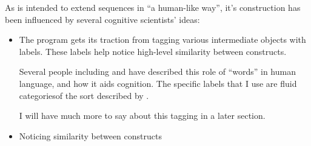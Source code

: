 \documentclass{article}
\begin{document}
As \seq is intended to extend sequences in ``a human-like way'', it's construction has been influenced by several cognitive scientists' ideas:

\begin{itemize}
\item The program gets its traction from tagging various intermediate objects with labels. These labels help \seq notice high-level similarity between constructs.

Several people including \dan and \andy have described this role of ``words'' in human language, and how it aids cognition. The specific labels that I use are fluid categoriesof the sort described by \hof.

I will have much more to say about this tagging in a later section.

\item Noticing similarity between constructs
\end{itemize}

\printindex
\end{document}
